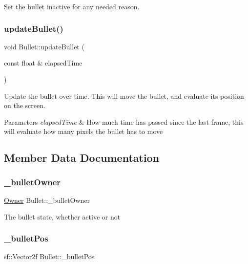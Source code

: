 Set the bullet inactive for any needed reason. 

\mbox{\label{class_bullet_a241c1ceb808ae0f93e4f66f28bbd525f}} 
\subsubsection{\texorpdfstring{update\+Bullet()}{updateBullet()}}
{\footnotesize\ttfamily void Bullet\+::update\+Bullet (\begin{DoxyParamCaption}\item[{const float \&}]{elapsed\+Time }\end{DoxyParamCaption})}



Update the bullet over time. This will move the bullet, and evaluate its position on the screen. 


\begin{DoxyParams}{Parameters}
{\em elapsed\+Time} & How much time has passed since the last frame, this will evaluate how many pixels the bullet has to move \\
\hline
\end{DoxyParams}


\subsection{Member Data Documentation}
\mbox{\label{class_bullet_af9fd5bbfc7e4e6a5a0f7e5af45360309}} 
\subsubsection{\texorpdfstring{\+\_\+bullet\+Owner}{\_bulletOwner}}
{\footnotesize\ttfamily \hyperlink{_bullet_8h_a3b5e9e55eb7b08d5702a101e529e5507}{Owner} Bullet\+::\+\_\+bullet\+Owner\hspace{0.3cm}{\ttfamily [private]}}

The bullet state, whether active or not \mbox{\label{class_bullet_a5889ed15f47debd2914c39f2dc71ec35}} 
\subsubsection{\texorpdfstring{\+\_\+bullet\+Pos}{\_bulletPos}}
{\footnotesize\ttfamily sf\+::\+Vector2f Bullet\+::\+\_\+bullet\+Pos\hspace{0.3cm}{\ttfamily [private]}}

